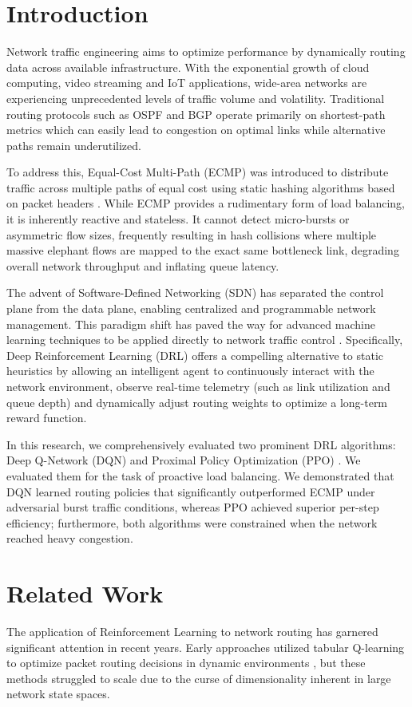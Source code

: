 \documentclass[10pt,twocolumn,letterpaper]{article}
\begin{document}
\section{Introduction}
Network traffic engineering aims to optimize performance by dynamically routing data across available infrastructure. With the exponential growth of cloud computing, video streaming and IoT applications, wide-area networks are experiencing unprecedented levels of traffic volume and volatility. Traditional routing protocols such as OSPF and BGP operate primarily on shortest-path metrics which can easily lead to congestion on optimal links while alternative paths remain underutilized.

To address this, Equal-Cost Multi-Path (ECMP) was introduced to distribute traffic across multiple paths of equal cost using static hashing algorithms based on packet headers \cite{hopps2000analysis}. While ECMP provides a rudimentary form of load balancing, it is inherently reactive and stateless. It cannot detect micro-bursts or asymmetric flow sizes, frequently resulting in hash collisions where multiple massive elephant flows are mapped to the exact same bottleneck link, degrading overall network throughput and inflating queue latency.

The advent of Software-Defined Networking (SDN) has separated the control plane from the data plane, enabling centralized and programmable network management. This paradigm shift has paved the way for advanced machine learning techniques to be applied directly to network traffic control \cite{pei2024enabling}. Specifically, Deep Reinforcement Learning (DRL) offers a compelling alternative to static heuristics by allowing an intelligent agent to continuously interact with the network environment, observe real-time telemetry (such as link utilization and queue depth) and dynamically adjust routing weights to optimize a long-term reward function.

In this research, we comprehensively evaluated two prominent DRL algorithms: Deep Q-Network (DQN) \cite{mnih2015human} and Proximal Policy Optimization (PPO) \cite{schulman2017proximal}. We evaluated them for the task of proactive load balancing. We demonstrated that DQN learned routing policies that significantly outperformed ECMP under adversarial burst traffic conditions, whereas PPO achieved superior per-step efficiency; furthermore, both algorithms were constrained when the network reached heavy congestion.

\section{Related Work}
The application of Reinforcement Learning to network routing has garnered significant attention in recent years. Early approaches utilized tabular Q-learning \cite{watkins1992q} to optimize packet routing decisions in dynamic environments \cite{boyan1994packet}, but these methods struggled to scale due to the curse of dimensionality inherent in large network state spaces.
\end{document}
